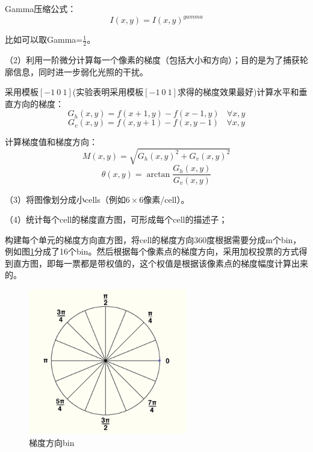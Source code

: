 \documentclass[12pt]{article}
\begin{document}
Gamma压缩公式：
\begin{displaymath}
    I(x,y)=I(x,y)^{gamma}
\end{displaymath}

比如可以取Gamma=$\frac{1}{2}$。

（2）利用一阶微分计算每一个像素的梯度（包括大小和方向）；目的是为了捕获轮廓信息，同时进一步弱化光照的干扰。
    
    采用模板$[-1~0~1]$(实验表明采用模板$[-1~0~1]$求得的梯度效果最好)计算水平和垂直方向的梯度：
        \begin{displaymath}
        G_{h}(x,y)=f(x+1,y)-f(x-1,y)~~~~\forall x,y
        \end{displaymath}
        \begin{displaymath}
        G_{v}(x,y)=f(x,y+1)-f(x,y-1)~~~~\forall x,y
        \end{displaymath}
        
        计算梯度值和梯度方向：
        \begin{displaymath}
        M(x,y)=\sqrt{G_{h}(x,y)^{2}+G_{v}(x,y)^2}
        \end{displaymath}
        \begin{displaymath}
        \theta(x,y)=\arctan\frac{G_{h}(x,y)}{G_{v}(x,y)}
        \end{displaymath}
        
（3）将图像划分成小cells（例如$6 \times 6$像素/cell）。

（4）统计每个cell的梯度直方图，可形成每个cell的描述子；
        
        构建每个单元的梯度方向直方图，将cell的梯度方向360度根据需要分成m个bin，例如图\ref{fig:bin}分成了16个bin。然后根据每个像素点的梯度方向，采用加权投票的方式得到直方图，即每一票都是带权值的，这个权值是根据该像素点的梯度幅度计算出来的。
        \begin{figure}
            \centering
            \includegraphics[width=0.3\linewidth]{bin}
            \caption{梯度方向bin}
            \label{fig:bin}
        \end{figure}
       
\end{document}
